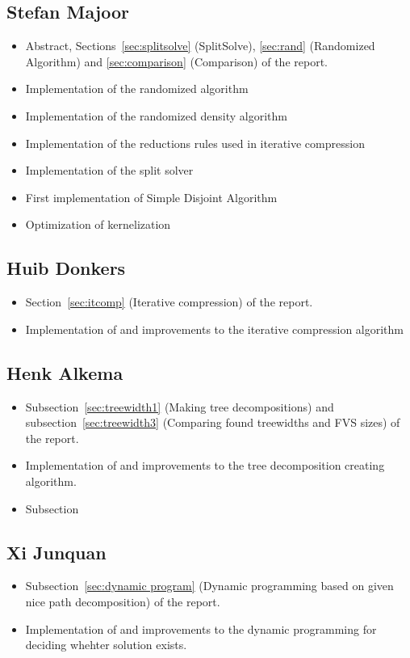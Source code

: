 \subsection{Stefan Majoor}
\begin{itemize}
 \item Abstract, Sections~\ref{sec:splitsolve} (SplitSolve), \ref{sec:rand} (Randomized Algorithm) and \ref{sec:comparison} (Comparison) of the report.
 \item Implementation of the randomized algorithm
 \item Implementation of the randomized density algorithm
 \item Implementation of the reductions rules used in iterative compression
 \item Implementation of the split solver
 \item First implementation of Simple Disjoint Algorithm
 \item Optimization of kernelization
\end{itemize}

\subsection{Huib Donkers}
\begin{itemize}
 \item Section~\ref{sec:itcomp} (Iterative compression)
 of the report.
 \item Implementation of and improvements to the iterative compression algorithm
\end{itemize}

\subsection{Henk Alkema}
\begin{itemize}
 \item Subsection~\ref{sec:treewidth1} (Making tree decompositions) and subsection~\ref{sec:treewidth3} (Comparing found treewidths and FVS sizes) of the report.
 \item Implementation of and improvements to the tree decomposition creating algorithm.
 \item Subsection
\end{itemize}

\subsection{Xi Junquan}
\begin{itemize}
 \item Subsection~\ref{sec:dynamic program} (Dynamic programming based on given nice path decomposition) of the report.
 \item Implementation of and improvements to the dynamic programming for deciding whehter solution exists.
\end{itemize}

